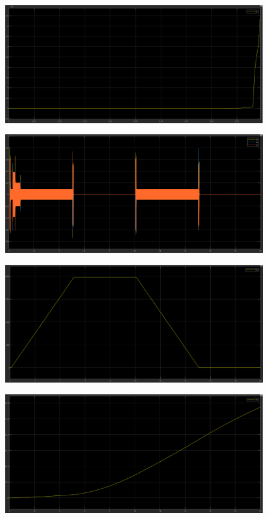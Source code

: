\documentclass{article}
\begin{document}
\begin{figure}[H]
    \centering
    \includegraphics[width=1\textwidth]{5.2.5.d.13.png}
\end{figure}

\begin{figure}[H]
    \centering
    \includegraphics[width=1\textwidth]{5.2.5.d.14.png}
\end{figure}

\begin{figure}[H]
    \centering
    \includegraphics[width=1\textwidth]{5.2.5.d.15.png}
\end{figure}

\begin{figure}[H]
    \centering
    \includegraphics[width=1\textwidth]{5.2.5.d.16.png}
\end{figure}
\end{document}
